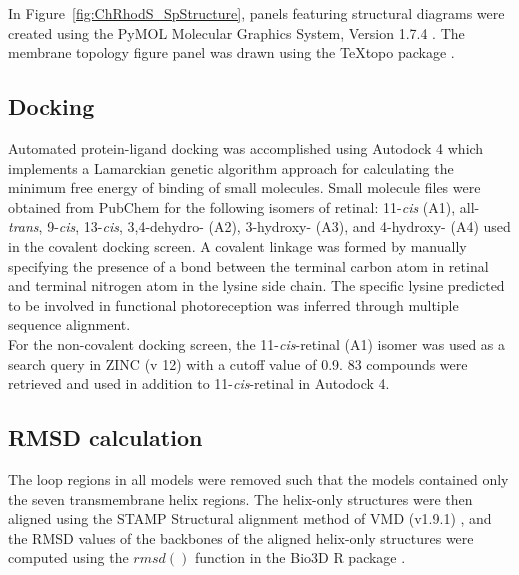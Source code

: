 \indent In Figure~\ref{fig:ChRhodS_SpStructure}, panels featuring structural diagrams were created using the PyMOL Molecular Graphics System, Version 1.7.4 \cite{PyMOL}. The membrane topology figure panel was drawn using the {\TeX}topo package \cite{Beitz2000textopo}.\\
\subsection*{Docking}
\indent Automated protein-ligand docking was accomplished using Autodock 4 \cite{Morris2009} which implements a Lamarckian genetic algorithm approach for calculating the minimum free energy of binding of small molecules. Small molecule files were obtained from PubChem \cite{Bolton2008} for the following isomers of retinal: 11-\textit{cis} (A1), all-\textit{trans}, 9-\textit{cis}, 13-\textit{cis}, 3,4-dehydro- (A2), 3-hydroxy- (A3), and 4-hydroxy- (A4) used in the covalent docking screen. A covalent linkage was formed by manually specifying the presence of a bond between the terminal carbon atom in retinal and terminal nitrogen atom in the lysine side chain. The specific lysine predicted to be involved in functional photoreception was inferred through multiple sequence alignment.\\
\indent For the non-covalent docking screen, the 11-\textit{cis}-retinal (A1) isomer was used as a search query in ZINC (v 12) \cite{Irwin2005} with a cutoff value of 0.9. 83 compounds were retrieved and used in addition to 11-\textit{cis}-retinal in Autodock 4.\\

\subsection*{RMSD calculation}
The loop regions in all models were removed such that the models contained only the seven transmembrane helix regions. The helix-only structures were then aligned using the STAMP Structural alignment method \cite{Russell1992} of VMD (v1.9.1) \cite{Humphrey1996}, and the RMSD values of the backbones of the aligned helix-only structures were computed using the $rmsd()$ function in the Bio3D R package \cite{Grant2006}.\\

